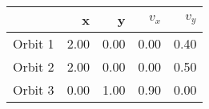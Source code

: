 \begin{tabular}{lrrrr}
\toprule
{} &    x &    y &  $v_x$ &  $v_y$ \\
\midrule
Orbit 1 & 2.00 & 0.00 &   0.00 &   0.40 \\
Orbit 2 & 2.00 & 0.00 &   0.00 &   0.50 \\
Orbit 3 & 0.00 & 1.00 &   0.90 &   0.00 \\
\bottomrule
\end{tabular}
